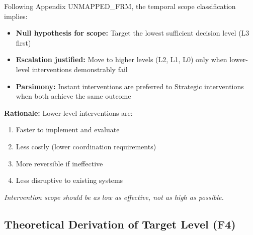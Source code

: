 \begin{tcolorbox}[colback=red!5!white, colframe=red!75!black,
    title=\textbf{Methodological Note: XVIII Exclusion Principle for Scope}]

Following Appendix UNMAPPED_FRM, the temporal scope classification implies:

\begin{itemize}[nosep]
    \item \textbf{Null hypothesis for scope:} Target the lowest sufficient decision level (L3 first)
    \item \textbf{Escalation justified:} Move to higher levels (L2, L1, L0) only when lower-level interventions demonstrably fail
    \item \textbf{Parsimony:} Instant interventions are preferred to Strategic interventions when both achieve the same outcome
\end{itemize}

\textbf{Rationale:} Lower-level interventions are:
\begin{enumerate}[nosep]
    \item Faster to implement and evaluate
    \item Less costly (lower coordination requirements)
    \item More reversible if ineffective
    \item Less disruptive to existing systems
\end{enumerate}

\textit{Intervention scope should be as low as effective, not as high as possible.}
\end{tcolorbox}


\subsection{Theoretical Derivation of Target Level (F4)}
\label{sec:hhh-level}

